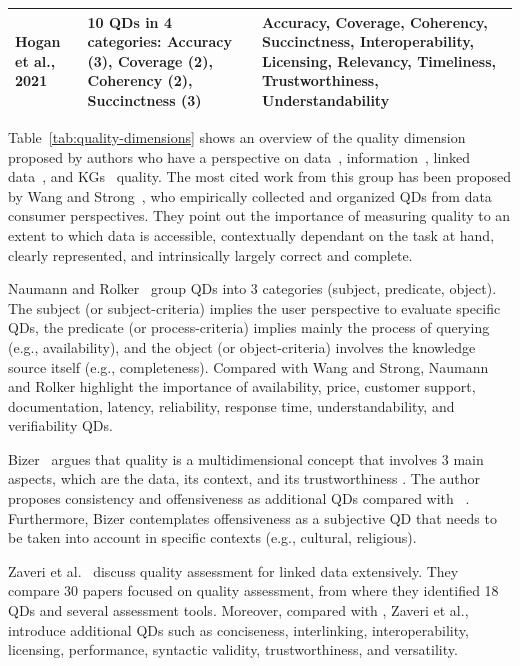 \documentclass[runningheads]{llncs}
\begin{document}
\begin{table}
\begin{tabular}{|p{1.3cm}|p{3cm}|p{7.5cm}|}
\hline
Hogan et al., 2021~\cite{Hogan21} & 10 QDs in 4 categories: Accuracy (3), Coverage (2), Coherency (2), Succinctness (3) & Accuracy, Coverage, Coherency, Succinctness, Interoperability, Licensing, Relevancy, Timeliness, Trustworthiness, Understandability \\ 
\hline
\end{tabular}
\end{table}
%
Table~\ref{tab:quality-dimensions} shows an overview of the quality dimension proposed by authors who have a perspective on data~\cite{WangS96}, information~\cite{bizer2007,NaumannR00}, linked data~\cite{FarberBMR18,ZaveriRMPLA16}, and KGs~\cite{FenselSAHKPTUW20} quality. 
%
The most cited work from this group has been proposed by Wang and Strong~\cite{WangS96}, who empirically collected and organized QDs from data consumer perspectives. They point out the importance of measuring quality to an extent to which data is accessible, contextually dependant on the task at hand, clearly represented, and intrinsically largely correct and complete.

Naumann and Rolker~\cite{NaumannR00} group QDs into 3 categories (subject, predicate, object). The subject (or subject-criteria) implies the user perspective to evaluate specific QDs, the predicate (or process-criteria) implies mainly the process of querying (e.g., availability), and the object (or object-criteria) involves the knowledge source itself (e.g., completeness). Compared with Wang and Strong, Naumann and Rolker highlight the importance of availability, price, customer support, documentation, latency, reliability, response time, understandability, and verifiability QDs. 

Bizer~\cite{bizer2007} argues that quality is a multidimensional concept that involves 3 main aspects, which are the data, its context, and its trustworthiness
. The author proposes consistency and offensiveness as additional QDs compared with ~\cite{NaumannR00,WangS96}. Furthermore, Bizer contemplates offensiveness as a subjective QD that needs to be taken into account in specific contexts (e.g., cultural, religious).

Zaveri et al.~\cite{ZaveriRMPLA16} discuss quality assessment for linked data extensively. They compare 30 papers focused on quality assessment, from where they identified 18 QDs and several assessment tools. Moreover, compared with \cite{bizer2007,NaumannR00,WangS96}, Zaveri et al., introduce additional QDs such as conciseness, interlinking, interoperability, licensing, performance, syntactic validity, trustworthiness, and versatility.
\end{document}
